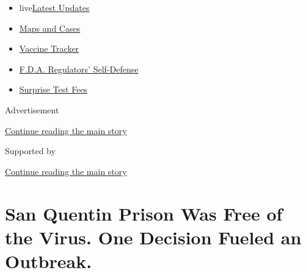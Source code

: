 \begin{itemize}
\tightlist
\item
  live\href{https://www.nytimes3xbfgragh.onion/2020/09/11/world/covid-19-coronavirus.html?name=styln-coronavirus-national\&region=TOP_BANNER\&block=storyline_menu_recirc\&action=click\&pgtype=Article\&impression_id=4b17b141-f4c5-11ea-ad1e-89255628ebac\&variant=undefined}{Latest
  Updates}
\item
  \href{https://www.nytimes3xbfgragh.onion/interactive/2020/us/coronavirus-us-cases.html?name=styln-coronavirus-national\&region=TOP_BANNER\&block=storyline_menu_recirc\&action=click\&pgtype=Article\&impression_id=4b17b142-f4c5-11ea-ad1e-89255628ebac\&variant=undefined}{Maps
  and Cases}
\item
  \href{https://www.nytimes3xbfgragh.onion/interactive/2020/science/coronavirus-vaccine-tracker.html?name=styln-coronavirus-national\&region=TOP_BANNER\&block=storyline_menu_recirc\&action=click\&pgtype=Article\&impression_id=4b17b143-f4c5-11ea-ad1e-89255628ebac\&variant=undefined}{Vaccine
  Tracker}
\item
  \href{https://www.nytimes3xbfgragh.onion/2020/09/10/us/politics/fda-coronavirus-vaccine.html?name=styln-coronavirus-national\&region=TOP_BANNER\&block=storyline_menu_recirc\&action=click\&pgtype=Article\&impression_id=4b17b144-f4c5-11ea-ad1e-89255628ebac\&variant=undefined}{F.D.A.
  Regulators' Self-Defense}
\item
  \href{https://www.nytimes3xbfgragh.onion/2020/09/09/upshot/coronavirus-surprise-test-fees.html?name=styln-coronavirus-national\&region=TOP_BANNER\&block=storyline_menu_recirc\&action=click\&pgtype=Article\&impression_id=4b17b145-f4c5-11ea-ad1e-89255628ebac\&variant=undefined}{Surprise
  Test Fees}
\end{itemize}

Advertisement

\protect\hyperlink{after-top}{Continue reading the main story}

Supported by

\protect\hyperlink{after-sponsor}{Continue reading the main story}

\hypertarget{san-quentin-prison-was-free-of-the-virus-one-decision-fueled-an-outbreak}{%
\section{San Quentin Prison Was Free of the Virus. One Decision Fueled
an
Outbreak.}\label{san-quentin-prison-was-free-of-the-virus-one-decision-fueled-an-outbreak}}

